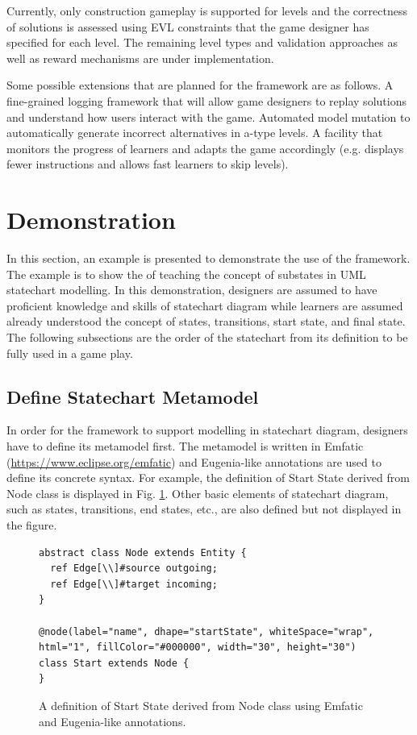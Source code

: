 \documentclass[conference]{IEEEtran}
\begin{document}
Currently, only construction gameplay is supported for levels and the correctness of solutions is assessed using EVL \cite{kolovos2006eclipse} constraints that the game designer has specified for each level. The remaining level types and validation approaches as well as reward mechanisms are under implementation.

Some possible extensions that are planned for the framework are as follows. A fine-grained logging framework that will allow game designers to replay solutions and understand how users interact with the game. Automated model mutation to automatically generate incorrect alternatives in a-type levels. A facility that monitors the progress of learners and adapts the game accordingly (e.g. displays fewer instructions and allows fast learners to skip levels).

\section{Demonstration}
In this section, an example is presented to demonstrate the use of the framework. The example is to show the of teaching the concept of substates in UML statechart modelling. In this demonstration, designers are assumed to have proficient knowledge and skills of statechart diagram while learners are assumed already understood the concept of states, transitions, start state, and final state. The following subsections are the order of the statechart from its definition to be fully used in a game play.
 
\subsection{Define Statechart Metamodel}
In order for the framework to support modelling in statechart diagram, designers have to define its metamodel first. The metamodel is written in Emfatic (\url{https://www.eclipse.org/emfatic}) and Eugenia-like annotations \cite{kolovos2015eugenia} are used to define its concrete syntax. For example, the definition of Start State derived from Node class is displayed in Fig. \ref{metamodel}. Other basic elements of statechart diagram, such as states, transitions, end states, etc., are also defined but not displayed in the figure.  

\begin{figure}[th]
\centering
\begin{lstlisting}
abstract class Node extends Entity {
  ref Edge[\\]#source outgoing;
  ref Edge[\\]#target incoming;
}

@node(label="name", dhape="startState", whiteSpace="wrap", html="1", fillColor="#000000", width="30", height="30")
class Start extends Node {
}
\end{lstlisting} 
\caption{A definition of Start State derived from Node class using Emfatic and Eugenia-like annotations.}
\label{metamodel}
\end{figure}
\end{document}
